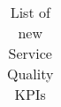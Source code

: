 \begin{landscape}
\begin{table}[]
\begin{tabular}{|l|l|l|l|}
\end{tabular}
\caption{List of new Service Quality KPIs}
\label{tab:servicequality}
\end{table}
\end{landscape}